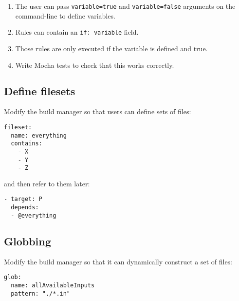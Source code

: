 \documentclass[krantzl]{krantz}
\begin{document}
\begin{enumerate}

\item 

The user can pass \texttt{variable=true} and \texttt{variable=false} arguments on the command-line
    to define variables.



\item 

Rules can contain an \texttt{if: variable} field.



\item 

Those rules are only executed if the variable is defined and true.



\item 

Write Mocha tests to check that this works correctly.



\end{enumerate}

\subsection*{Define filesets}


Modify the build manager so that users can define sets of files:

\begin{lstlisting}[frame=single,frameround=tttt]
fileset:
  name: everything
  contains:
    - X
    - Y
    - Z
\end{lstlisting}


\noindent and then refer to them later:

\begin{lstlisting}[frame=single,frameround=tttt]
- target: P
  depends:
  - @everything
\end{lstlisting}

\subsection*{Globbing}


Modify the build manager so that it can dynamically construct a set of files:

\begin{lstlisting}[frame=single,frameround=tttt]
glob:
  name: allAvailableInputs
  pattern: "./*.in"
\end{lstlisting}
\end{document}
